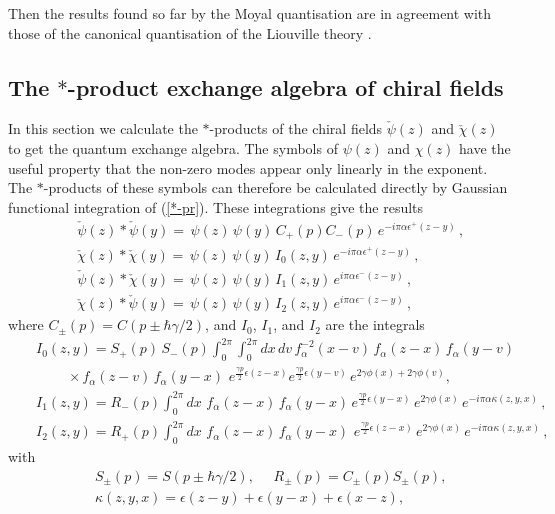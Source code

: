 \documentclass[a4paper,12pt]{article}
\begin{document}
\noindent
Then the results found so far by the Moyal
quantisation are in agreement with those of the canonical quantisation
of the Liouville theory \cite{Thorn, OW}.


\subsection{The $*$-product exchange algebra of chiral fields}

In this section we calculate the $*$-products of the chiral fields
$\check\psi(z)$ and $\check\chi(z)$ to get the quantum exchange
algebra.  The symbols of $\psi(z)$ and $\chi(z)$ have the useful
property that the non-zero modes appear only linearly in the exponent.
The $*$-products of these symbols can therefore be calculated  directly
by Gaussian functional integration of (\ref{*-pr}). These
integrations give the results
\begin{eqnarray}\label{*pr-psi-psi}
&&\check\psi (z)*\check\psi(y)=
\,\psi (z)\,\psi(y)\,C_+(p)C_-(p)\,e^{-i\pi\alpha\epsilon^+(z-y)}\,,\\
\label{*pr-chi-chi}
&&\check\chi (z)*\check\chi(y)=
\,\psi (z)\,\psi(y)\,
I_0(z,y)\,e^{-i\pi\alpha\epsilon^+(z-y)}\,,\\
\label{*pr-psi-chi}
&&\check\psi (z)*\check\chi(y)=
\,\psi (z)\,\psi(y)\,I_1(z,y)\,e^{i\pi\alpha\epsilon^-(z-y)}\,,\\
\label{*pr-chi-psi}
&&\check\chi (z)*\check\psi(y)=
\,\psi (z)\,\psi(y)\,
I_2(z,y)\,e^{i\pi\alpha\epsilon^-(z-y)}\,,
\end{eqnarray}
where $C_\pm(p)=C(p\pm\hbar\gamma/2)$, and
$I_0$, $I_1$, and $I_2$ are the integrals
\begin{eqnarray}\label{I-chi-chi}
&&I_0(z,y)=S_+(p)\,S_-(p)
\int_0^{2\pi}\int_0^{2\pi}dx\,dv\,f_\alpha^{-2}(x-v)\,
f_\alpha(z-x)\,f_\alpha(y-v)\nonumber\\
&&~~~~~~~~~~
\times f_\alpha(z-v)\,f_\alpha(y-x)\,
\,e^{\frac{\gamma p}{2}\epsilon(z-x)}e^{\frac{\gamma p}{2}
\epsilon(y-v)}
\,e^{2\gamma\phi(x)+2\gamma\phi(v)},\\
\label{I-psi-chi-I}
&&I_1(z,y) =R_-(p)
\int_0^{2\pi}dx\,\,f_\alpha(z-x)\,f_\alpha(y-x)\,
e^{\frac{\gamma p}{2}\epsilon (y-x)}
\,e^{2\gamma\phi(x)}\,e^{-i\pi\alpha\kappa(z,y,x)}\,,\\
\label{I-chi-psi}
&&I_2(z,y)=R_+(p)\int_0^{2\pi}dx\,\,f_\alpha(z-x)\,f_\alpha(y-x)\,
\,e^{\frac{\gamma p}{2}\epsilon (z-x)}\,
e^{2\gamma\phi(x)}\,e^{-i\pi\alpha\kappa(z,y,x)}\,,
\end{eqnarray}
with
\begin{eqnarray}\label{kappa}
&&S_\pm(p)=S(p\pm\hbar\gamma/2),~~~~~~ R_\pm(p)=C_\pm(p) S_\pm(p),\nonumber \\
&&\kappa(z,y,x) =\epsilon(z-y)+\epsilon(y-x)+\epsilon(x-z),
\end{eqnarray}
\end{document}
